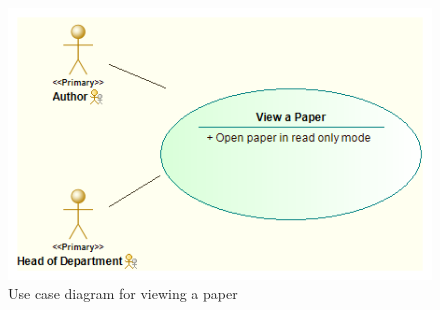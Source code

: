 \documentclass[english]{article}
\begin{document}
\begin{itemize}
				\begin{figure}
					\includegraphics[width=\linewidth]{View a paper Use Case}
					\caption{Use case diagram for viewing a paper}
				\end{figure}
				
			\end{itemize}
				
\end{document}
